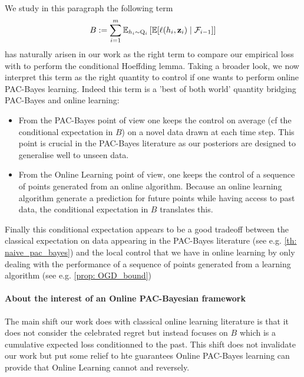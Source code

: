  We study in this paragraph the following term
  $$B:=\sum_{i=1}^m \mathbb{E}_{h_i\sim \mathrm{Q}_{i}}\left[ \mathbb{E}[\ell(h_i,\mathbf{z}_i) \mid \mathcal{F}_{i-1}]    \right]$$ has naturally arisen in our work as the right term to compare our empirical loss with to perform the conditional Hoeffding lemma.
 Taking a broader look, we now interpret this term as the right quantity to control if one wants to perform online PAC-Bayes learning. Indeed this term is a 'best of both world' quantity bridging PAC-Bayes and online learning:

 \begin{itemize}
   \item From the PAC-Bayes point of view one keeps the control on average (cf the conditional expectation in $B$) on a novel data drawn at each time step. This point is crucial in the PAC-Bayes literature as our posteriors are designed to generalise well to unseen data.
   \item From the Online Learning point of view, one keeps the control of a sequence of points generated from an online algorithm. Because an online learning algorithm generate a prediction for future points while having access to past data, the conditional expectation in $B$ translates this.
 \end{itemize}

Finally this conditional expectation appears to be a good tradeoff between the classical expectation on data appearing in the PAC-Bayes literature (see e.g. \cref{th: naive_pac_bayes}) and the local control that we have in online learning by only dealing with the performance of a sequence of points generated from a learning algorithm (see e.g. \cref{prop: OGD_bound})


\paragraph{About the interest of an Online PAC-Bayesian framework}
The main shift our work does with classical online learning literature is that it does not consider the celebrated regret but instead focuses on $B$ which is a cumulative expected loss conditionned to the past. This shift does not invalidate our work but put some relief to hte guarantees Online PAC-Bayes learning can provide that Online Learning cannot and reversely.


